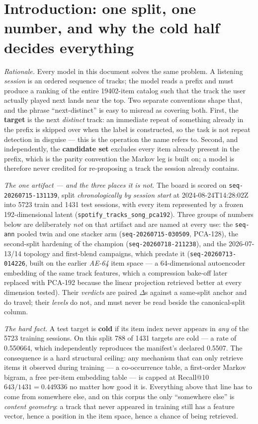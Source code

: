 \documentclass[11pt]{article}
\newcommand{\dsid}[1]{\texttt{\small #1}}
\begin{document}
\section{Introduction: one split, one number, and why the cold half decides everything}
\label{sec:intro}

\emph{Rationale.} Every model in this document solves the same problem. A
listening \emph{session} is an ordered sequence of tracks; the model reads a
prefix and must produce a ranking of the entire \num{19402}-item catalog such
that the track the user actually played next lands near the top. Two separate
conventions shape that, and the phrase ``next-distinct'' is easy to misread as
covering both. First, the \textbf{target} is the next \emph{distinct} track: an
immediate repeat of something already in the prefix is skipped over when the
label is constructed, so the task is not repeat detection in disguise --- this
is the operation the name refers to. Second, and independently, the
\textbf{candidate set} excludes every item already present in the prefix, which
is the parity convention the Markov leg is built on; a model is therefore never
credited for re-proposing a track the session already contains.

\emph{The one artifact --- and the three places it is not.} The board is scored
on \dsid{seq-20260715-131139}, split \emph{chronologically by session start} at
2024-08-24T14:28:02Z into \num{5723} train and \num{1431} test sessions, with
every item represented by a frozen \num{192}-dimensional latent
(\dsid{spotify\_tracks\_song\_pca192}). Three groups of numbers below are
deliberately \emph{not} on that artifact and are named at every use: the
\texttt{seq-ann} pooled twin and one stacker arm (\dsid{seq-20260715-030509},
PCA-128), the second-split hardening of the champion
(\dsid{seq-20260718-211238}), and the 2026-07-13/14 topology and first-blend
campaigns, which predate it (\dsid{seq-20260713-014226}, built on the earlier
\emph{AE-64} item space --- a \num{64}-dimensional autoencoder embedding of the
same track features, which a compression bake-off later replaced with PCA-192
because the linear projection retrieved better at every dimension tested). Their \emph{verdicts} are paired $\Delta$s against
a same-split anchor and do travel; their \emph{levels} do not, and must never be
read beside the canonical-split column.

\emph{The hard fact.} A test target is \textbf{cold} if its item index never
appears in \emph{any} of the \num{5723} training sessions. On this split
\num{788} of \num{1431} targets are cold --- a rate of \num{0.550664}, which
independently reproduces the manifest's declared \num{0.5507}. The consequence
is a hard structural ceiling: any mechanism that can only retrieve items it
observed during training --- a co-occurrence table, a first-order Markov bigram,
a free per-item embedding table --- is capped at Recall@10 $\num{643}/\num{1431}
= \num{0.449336}$ no matter how good it is. Everything above that line has to
come from somewhere else, and on this corpus the only ``somewhere else'' is
\emph{content geometry}: a track that never appeared in training still has a
feature vector, hence a position in the item space, hence a chance of being
retrieved.
\end{document}
